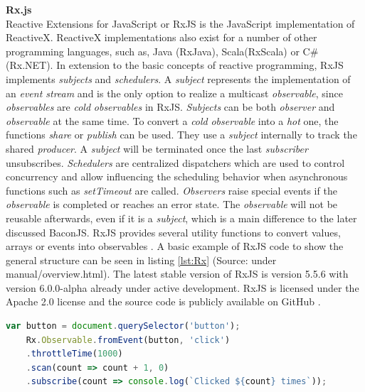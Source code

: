 	\noindent\textbf{Rx.js}\\
	Reactive Extensions for JavaScript or RxJS \cite{RxJS} is the JavaScript implementation of ReactiveX. ReactiveX implementations also exist for a number of other programming languages, such as, Java (RxJava), Scala(RxScala) or C\#(Rx.NET). In extension to the basic concepts of reactive programming, RxJS implements \emph{subjects} and \emph{schedulers}. A \emph{subject} represents the implementation of an \emph{event stream} and is the only option to realize a multicast \emph{observable}, since \emph{observables} are \emph{cold} \emph{observables} in RxJS. \emph{Subjects} can be both \emph{observer} and \emph{observable} at the same time. To convert a \emph{cold} \emph{observable} into a \emph{hot} one, the functions \emph{share} or \emph{publish} can be used. They use a \emph{subject} internally to track the shared \emph{producer}. A \emph{subject} will be terminated once the last \emph{subscriber} unsubscribes. \emph{Schedulers} are centralized dispatchers which are used to control concurrency and allow influencing the scheduling behavior when asynchronous functions such as \emph{setTimeout}\cite{RxJsDocu} are called. \emph{Observers} raise special events if the \emph{observable} is completed or reaches an error state. The \emph{observable} will not be reusable afterwards, even if it is a \emph{subject}, which is a main difference to the later discussed BaconJS. RxJS provides several utility functions to convert values, arrays or events into observables \cite{ThesisBaradur}. A basic example of RxJS code to show the general structure can be seen in listing \ref{lst:Rx} (Source: \cite{RxJsDocu} under manual/overview.html).
	The latest stable version of RxJS is version 5.5.6 with version 6.0.0-alpha already under active development. RxJS is licensed under the Apache 2.0 license and the source code is publicly available on GitHub \cite{RxJSRepo}.

	\begin{lstlisting}[language=JavaScript, caption={Example of RxJS code.},label={lst:Rx}]
	var button = document.querySelector('button');
	Rx.Observable.fromEvent(button, 'click')
	.throttleTime(1000)
	.scan(count => count + 1, 0)
	.subscribe(count => console.log(`Clicked ${count} times`));
	\end{lstlisting}
	
